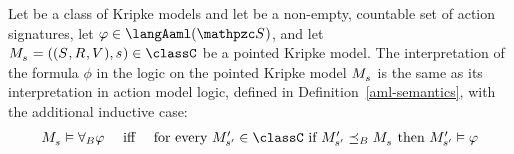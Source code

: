 
\begin{definition}
Let \classC{} be a class of Kripke models and let \aSignatureFamily{} be a non-empty, countable set of action signatures, let $\phi \in \langAaml(\aSignatureFamily)$, and let $\kPModelAndTuple{\kStateS} \in \classC$ be a pointed Kripke model.
The interpretation of the formula $\phi$ in the logic \logicAamlC{} on the pointed Kripke model $\kPModel{\kStateS}$ is the same as its interpretation in action model logic, defined in Definition~\ref{aml-semantics}, with the additional inductive case:
$$
\begin{array}{lcl}
    \kPModel{\kStateS} \entails \allactsBs \phi & \text{ iff } & \text{for every } \kPModelP{\kStateSP} \in \classC \text{ if } \kPModelP{\kStateSP} \refinesBs \kPModel{\kStateS} \text{ then } \kPModelP{\kStateSP} \entails \phi
\end{array}
$$
\end{definition}
